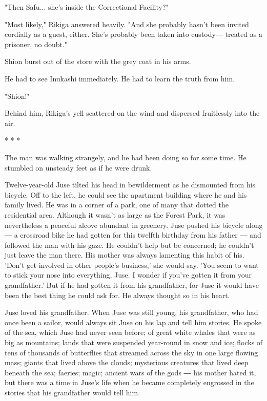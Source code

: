"Then Safu... she's inside the Correctional Facility?"

"Most likely," Rikiga answered heavily. "And she probably hasn't been
invited cordially as a guest, either. She's probably been taken into
custody― treated as a prisoner, no doubt."

Shion burst out of the store with the grey coat in his arms.

He had to see Inukashi immediately. He had to learn the truth from him.

"Shion!"

Behind him, Rikiga's yell scattered on the wind and dispersed
fruitlessly into the air.

* * *

The man was walking strangely, and he had been doing so for some time.
He stumbled on unsteady feet as if he were drunk.

Twelve-year-old Juse tilted his head in bewilderment as he dismounted
from his bicycle. Off to the left, he could see the apartment building
where he and his family lived. He was in a corner of a park, one of many
that dotted the residential area. Although it wasn't as large as the
Forest Park, it was nevertheless a peaceful alcove abundant in greenery.
Juse pushed his bicycle along ― a crossroad bike he had gotten for this
twelfth birthday from his father ― and followed the man with his gaze.
He couldn't help but be concerned; he couldn't just leave the man there.
His mother was always lamenting this habit of his. 'Don't get involved
in other people's business,' she would say. 'You seem to want to stick
your nose into everything, Juse. I wonder if you've gotten it from your
grandfather.' But if he had gotten it from his grandfather, for Juse it
would have been the best thing he could ask for. He always thought so in
his heart.

Juse loved his grandfather. When Juse was still young, his grandfather,
who had once been a sailor, would always sit Juse on his lap and tell
him stories. He spoke of the sea, which Juse had never seen before; of
great white whales that were as big as mountains; lands that were
suspended year-round in snow and ice; flocks of tens of thousands of
butterflies that streamed across the sky in one large flowing mass;
giants that lived above the clouds; mysterious creatures that lived deep
beneath the sea; faeries; magic; ancient wars of the gods ― his mother
hated it, but there was a time in Juse's life when he became completely
engrossed in the stories that his grandfather would tell him.

